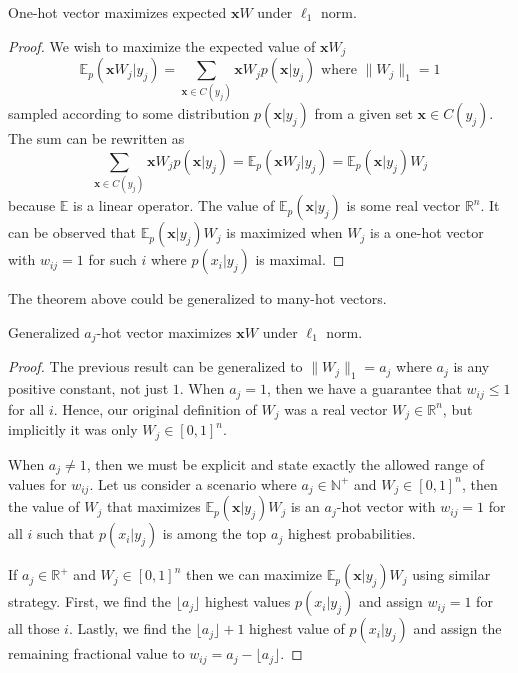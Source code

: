\documentclass[oneside,english,logo]{amuthesis}
\begin{document}
\begin{theorem}
One-hot vector maximizes expected $\boldsymbol{x}W$ under $\ell_1$ norm.
\end{theorem}
\begin{proof}
We wish to maximize the expected value of $\boldsymbol{x}W_j$ 
\[
\mathbb{E}_{p}(\boldsymbol{x}W_j|y_j)=\sum_{\boldsymbol{x}\in C(y_j)} \boldsymbol{x} W_j p(\boldsymbol{x}|y_j) \text{ where } \lVert W_j \rVert_1=1
\]
sampled according to some distribution $p(\boldsymbol{x}|y_j)$ from a given set $\boldsymbol{x}\in C(y_j)$.  The sum can be rewritten as
\[
\sum_{\boldsymbol{x}\in C(y_j)} \boldsymbol{x} W_j p(\boldsymbol{x}|y_j) = \mathbb{E}_{p}(\boldsymbol{x} W_j|y_j) = \mathbb{E}_{p}(\boldsymbol{x}|y_j)W_j
\]
because $\mathbb{E}$ is a linear operator. The value of $\mathbb{E}_{p}(\boldsymbol{x}|y_j)$ is some real vector $\mathbb{R}^n$.  It can be observed that $\mathbb{E}_{p}(\boldsymbol{x}|y_j)W_j$ is maximized when $W_j$ is a one-hot vector with $w_{ij}=1$ for such $i$ where $p(x_i|y_j)$ is maximal. 
\end{proof}
The theorem above could be generalized to many-hot vectors. 
\begin{theorem}
	\label{theorem:a_j-hot_maximizes_xW_under_l1}
Generalized $a_j$-hot vector maximizes $\boldsymbol{x}W$ under $\ell_1$ norm.
\end{theorem}
\begin{proof}
The previous result can be generalized to $\lVert W_j \rVert_1 = a_j$ where $a_j$ is any positive constant, not just $1$. When $a_j=1$, then we have a guarantee that $w_{ij}\le 1$ for all $i$. Hence, our original definition of $W_j$ was a real vector $W_j\in \mathbb{R}^n$, but implicitly it was only $W_j\in [0,1]^n$. 

When $a_j\ne 1$, then we must be explicit and state exactly the allowed range of values for $w_{ij}$. Let us consider a scenario where $a_j\in\mathbb{N}^+$ and $W_j\in [0,1]^n$, then the value of $W_j$ that maximizes $\mathbb{E}_{p}(\boldsymbol{x}|y_j)W_j$ is an $a_j$-hot vector with $w_{ij}=1$ for all $i$ such that $p(x_i|y_j)$ is among the top $a_j$ highest probabilities. 

If $a_j\in\mathbb{R}^+$ and $W_j\in [0,1]^n$ then we can maximize $\mathbb{E}_{p}(\boldsymbol{x}|y_j)W_j$ using similar strategy. First, we find the $\lfloor a_j \rfloor$ highest values $p(x_i|y_j)$ and assign $w_{ij}=1$ for all those $i$. Lastly, we find the $\lfloor a_j \rfloor+1$ highest value of $p(x_i|y_j)$ and assign the remaining fractional value to $w_{ij}=a_j - \lfloor a_j \rfloor$. 
\end{proof}
\end{document}
